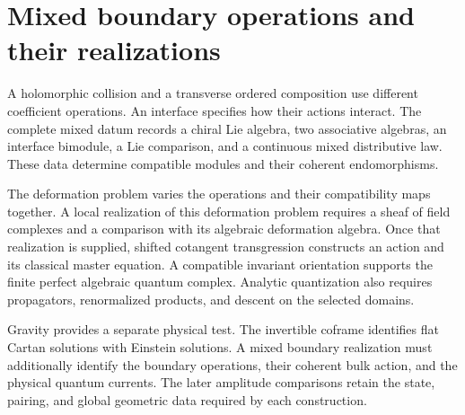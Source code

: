 \chapter*{Mixed boundary operations and their realizations}

A holomorphic collision and a transverse ordered composition use different coefficient operations. An interface specifies how their actions interact. The complete mixed datum records a chiral Lie algebra, two associative algebras, an interface bimodule, a Lie comparison, and a continuous mixed distributive law. These data determine compatible modules and their coherent endomorphisms.

The deformation problem varies the operations and their compatibility maps together. A local realization of this deformation problem requires a sheaf of field complexes and a comparison with its algebraic deformation algebra. Once that realization is supplied, shifted cotangent transgression constructs an action and its classical master equation. A compatible invariant orientation supports the finite perfect algebraic quantum complex. Analytic quantization also requires propagators, renormalized products, and descent on the selected domains.

Gravity provides a separate physical test. The invertible coframe identifies flat Cartan solutions with Einstein solutions. A mixed boundary realization must additionally identify the boundary operations, their coherent bulk action, and the physical quantum currents. The later amplitude comparisons retain the state, pairing, and global geometric data required by each construction.
